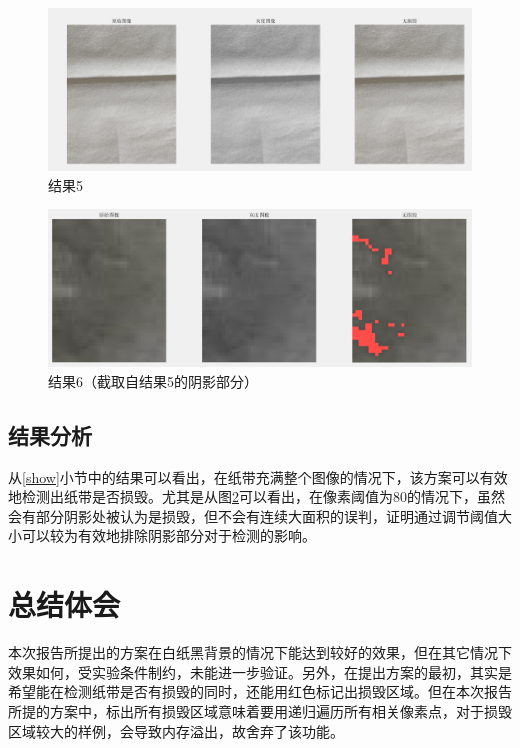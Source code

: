 \documentclass[UTF8]{ctexart}
\begin{document}
			\begin{figure}[H]
				\centering 
				\includegraphics[scale=0.4]{res5.png} 
				\caption{结果5} 
				\label{res5}
			\end{figure}
		
			\begin{figure}[H]
				\centering 
				\includegraphics[scale=0.4]{res6.png} 
				\caption{结果6（截取自结果5的阴影部分）} 
				\label{res6}
			\end{figure}
	
		\subsection{结果分析}
			\indent 从\ref{show}小节中的结果可以看出，在纸带充满整个图像的情况下，该方案可以有效地检测出纸带是否损毁。尤其是从图\ref{res6}可以看出，在像素阈值为$80$的情况下，虽然会有部分阴影处被认为是损毁，但不会有连续大面积的误判，证明通过调节阈值大小可以较为有效地排除阴影部分对于检测的影响。
	\section{总结体会}
		\indent 本次报告所提出的方案在白纸黑背景的情况下能达到较好的效果，但在其它情况下效果如何，受实验条件制约，未能进一步验证。另外，在提出方案的最初，其实是希望能在检测纸带是否有损毁的同时，还能用红色标记出损毁区域。但在本次报告所提的方案中，标出所有损毁区域意味着要用递归遍历所有相关像素点，对于损毁区域较大的样例，会导致内存溢出，故舍弃了该功能。

%
\end{document}
